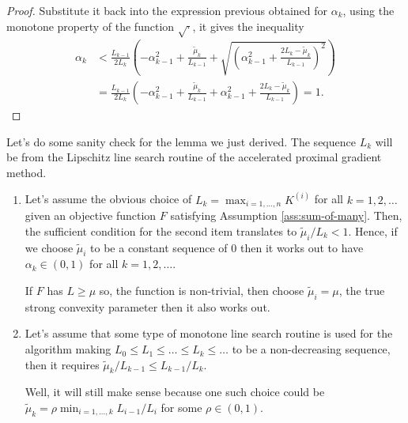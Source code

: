 \documentclass[12pt]{article}
\begin{document}
\begin{proof}
        Substitute it back into the expression previous obtained for $\alpha_k$, using the monotone property of the function $\sqrt{\cdot}$, it gives the inequality 
        \begin{align*}
            \alpha_k & < 
            \frac{L_{k-1}}{2L_k}\left(
                - \alpha_{k - 1}^2 + \frac{\tilde \mu_k}{L_{k - 1}}
                + \sqrt{
                    \left(
                        \alpha_{k - 1}^2 + 
                        \frac{2L_k - \tilde \mu_k}{L_{k - 1}}
                    \right)^2
                }
            \right)
            \\
            &= 
            \frac{L_{k-1}}{2L_k}\left(
                - \alpha_{k - 1}^2 + \frac{\tilde \mu_k}{L_{k - 1}}
                + \alpha_{k - 1}^2 + \frac{2L_k - \tilde \mu_k}{L_{k - 1}}
            \right) = 1. 
        \end{align*}
    \end{proof}
    \begin{remark}
        Let's do some sanity check for the lemma we just derived. 
        The sequence $L_k$ will be from the Lipschitz line search routine of the accelerated proximal gradient method. 
        \begin{enumerate}
            \item Let's assume the obvious choice of $L_k = \max_{i = 1, \ldots,n} K^{(i)}$ for all $k = 1, 2, \ldots$ given an objective function $F$ satisfying Assumption \ref{ass:sum-of-many}. 
            Then, the sufficient condition for the second item translates to $\tilde\mu_i/L_k < 1$. 
            Hence, if we choose $\tilde \mu_i$ to be a constant sequence of $0$ then it works out to have $\alpha_k \in (0, 1)$ for all $k = 1, 2, \ldots$. 
            \par
            If $F$ has $L \ge \mu$ so, the function is non-trivial, then choose $\tilde \mu_i = \mu$, the true strong convexity parameter then it also works out. 
            \item Let's assume that some type of monotone line search routine is used for the algorithm making $L_0 \le L_1 \le \ldots \le L_k \le \ldots$ to be a non-decreasing sequence, then it requires $\tilde \mu_k / L_{k - 1} \le L_{k - 1}/L_k$. 
            \par
            Well, it will still make sense because one such choice could be $\tilde \mu_k = \rho\min_{i = 1, \ldots, k} L_{i - 1}/L_i$ for some $\rho \in (0, 1)$. 
        \end{enumerate}
    \end{remark}
\end{document}
